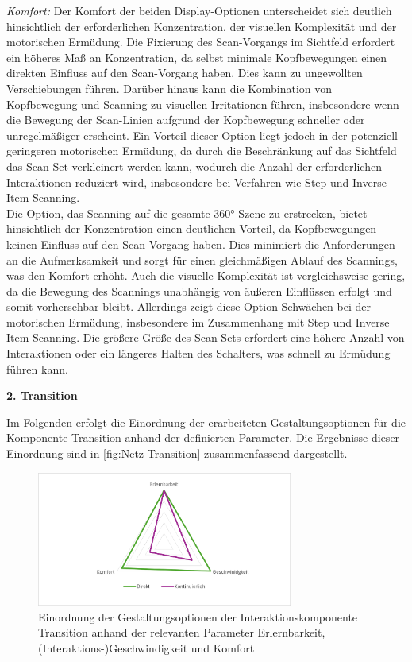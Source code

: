 \textit{Komfort:}
Der Komfort der beiden Display-Optionen unterscheidet sich deutlich hinsichtlich der erforderlichen Konzentration, der visuellen Komplexität und der motorischen Ermüdung.
Die Fixierung des Scan-Vorgangs im Sichtfeld erfordert ein höheres Maß an Konzentration, da selbst minimale Kopfbewegungen einen direkten Einfluss auf den Scan-Vorgang haben. Dies kann zu ungewollten Verschiebungen führen. Darüber hinaus kann die Kombination von Kopfbewegung und Scanning zu visuellen Irritationen führen, insbesondere wenn die Bewegung der Scan-Linien aufgrund der Kopfbewegung schneller oder unregelmäßiger erscheint. Ein Vorteil dieser Option liegt jedoch in der potenziell geringeren motorischen Ermüdung, da durch die Beschränkung auf das Sichtfeld das Scan-Set verkleinert werden kann, wodurch die Anzahl der erforderlichen Interaktionen reduziert wird, insbesondere bei Verfahren wie Step und Inverse Item Scanning. \\
Die Option, das Scanning auf die gesamte 360°-Szene zu erstrecken, bietet hinsichtlich der Konzentration einen deutlichen Vorteil, da Kopfbewegungen keinen Einfluss auf den Scan-Vorgang haben. Dies minimiert die Anforderungen an die Aufmerksamkeit und sorgt für einen gleichmäßigen Ablauf des Scannings, was den Komfort erhöht. Auch die visuelle Komplexität ist vergleichsweise gering, da die Bewegung des Scannings unabhängig von äußeren Einflüssen erfolgt und somit vorhersehbar bleibt. Allerdings zeigt diese Option Schwächen bei der motorischen Ermüdung, insbesondere im Zusammenhang mit Step und Inverse Item Scanning. Die größere Größe des Scan-Sets erfordert eine höhere Anzahl von Interaktionen oder ein längeres Halten des Schalters, was schnell zu Ermüdung führen kann. 

\textbf{2. Transition} 

Im Folgenden erfolgt die Einordnung der erarbeiteten Gestaltungsoptionen für die Komponente Transition anhand der definierten Parameter. Die Ergebnisse dieser Einordnung sind in \autoref{fig:Netz-Transition} zusammenfassend dargestellt. 

\begin{figure}[tbh]
    \centering
    \includegraphics[width=0.75\textwidth]{images/Netzdiagramm-Transition.png}
    \caption{Einordnung der Gestaltungsoptionen der Interaktionskomponente Transition anhand der relevanten Parameter Erlernbarkeit, (Interaktions-)Geschwindigkeit und Komfort}
    \label{fig:Netz-Transition}
\end{figure}


